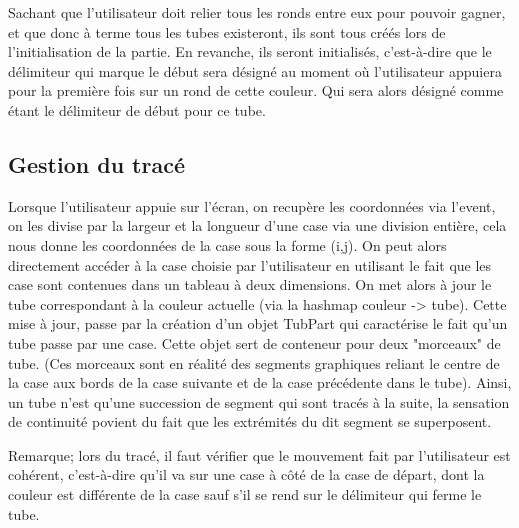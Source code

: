 \documentclass[12pt, a4paper]{article}%
\begin{document}
    Sachant que l'utilisateur doit relier tous les ronds entre eux pour pouvoir gagner, et que donc à terme tous les tubes
    existeront, ils sont tous créés lors de l'initialisation de la partie. En revanche, ils seront initialisés, c'est-à-dire que
    le délimiteur qui marque le début sera désigné au moment où l'utilisateur appuiera pour la première fois sur un rond de cette
    couleur. Qui sera alors désigné comme étant le délimiteur de début pour ce tube.
    \subsection{Gestion du tracé}
    Lorsque l'utilisateur appuie sur l'écran, on recupère les coordonnées via l'event, on les divise par la largeur et la longueur
    d'une case via une division entière, cela nous donne les coordonnées de la case sous la forme (i,j). On peut alors directement
    accéder à la case choisie par l'utilisateur en utilisant le fait que les case sont contenues dans un tableau à deux
    dimensions. On met alors à jour le tube correspondant à la couleur actuelle (via la hashmap couleur -> tube). Cette mise à
    jour, passe par la création d'un objet TubPart qui caractérise le fait qu'un tube passe par une case. Cette objet sert de
    conteneur pour deux "morceaux" de tube. (Ces morceaux sont en réalité des segments graphiques reliant le centre de la case aux
    bords de la case suivante et de la case précédente dans le tube). Ainsi, un tube n'est qu'une succession de segment qui sont
    tracés à la suite, la sensation de continuité povient du fait que les extrémités du dit segment se superposent.
    \newline

    Remarque; lors du tracé, il faut vérifier que le mouvement fait par l'utilisateur est cohérent, c'est-à-dire qu'il va sur une
    case à côté de la case de départ, dont la couleur est différente de la case sauf s'il se rend sur le délimiteur qui ferme le
    tube.
    
\end{document}
